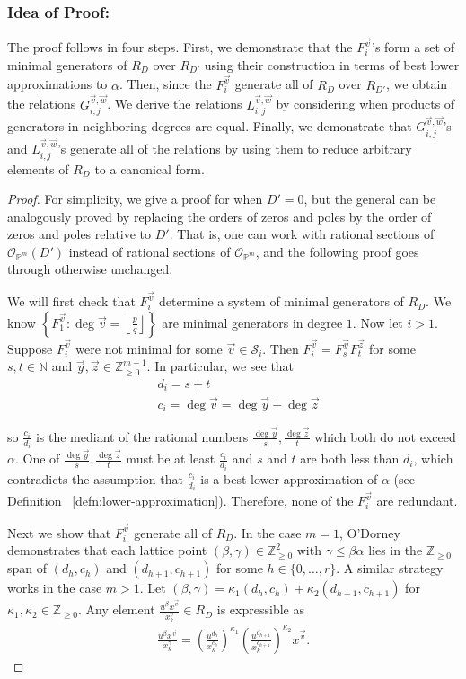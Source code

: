 \documentclass{amsart}
\theoremstyle{plain}
\theoremstyle{definition}
\theoremstyle{remark}
\numberwithin{equation}{section}
\newcommand\sssec{\subsubsection}
\newcommand\bn{{\mathbb N}}
\newcommand\bp{{\mathbb P}}
\newcommand\bz{{\mathbb Z}}
\newcommand\mss{\mathscr{S}}
\begin{document}
\sssec*{Idea of Proof:}
The proof follows in four steps. First, we demonstrate that
the $F_{i}^{\vec{v}}$'s form a set of minimal generators of $R_D$
over $R_{D'}$ using their construction in terms of best lower
approximations to $\alpha$. Then, since the $F_{i}^{\vec{v}}$ generate
all of $R_D$ over $R_{D'}$, we obtain the
relations $G_{i, j}^{\vec{v}, \vec{w}}$.
We derive the relations
$L_{i, j}^{\vec{v}, \vec{w}}$ by considering when products of
generators in neighboring degrees are equal. Finally, we demonstrate
that $G_{i, j}^{\vec{v}, \vec{w}}$'s and $L_{i, j}^{\vec{v}, \vec{w}}$'s
generate all of the relations by using them to reduce arbitrary
elements of
$R_D$ to a canonical form.

\begin{proof}
For simplicity, we give a proof for when $D' = 0$, but the general
can be analogously proved by replacing the orders of zeros and poles
by the order of zeros and poles relative to $D'$. That is,
one can work with rational sections of $\mathscr O_{\bp^m}(D')$
instead of rational sections of $\mathscr O_{\bp^m}$,
and the following proof goes through otherwise unchanged.

We will first check that $F^{\vec v}_i$ determine a system of minimal
generators of $R_D$. We know $\left\{F_{1}^{\vec{v}} : \deg \vec{v} =
\left\lfloor
\frac{p}{q} \right\rfloor \right\}$ are minimal generators in
degree $1$. Now let $i > 1$. Suppose $F_i^{\vec{v}}$ were not
minimal for some $\vec{v} \in \mss_i$. Then $F_i^{\vec{v}} =
F_{s}^{\vec{y}} F_{t}^{\vec{z}}$ for some $s, t \in \bn$ and
$\vec{y}, \vec{z} \in \bz_{ \geq 0}^{m + 1}$. In particular, we see
that 
\begin{align*}
	&d_i = s + t \\
	&c_i = \deg \vec{v} = \deg \vec{y} + \deg \vec{z}
\end{align*}

\noindent
so $\frac{c_i}{d_i}$ is the mediant of the rational numbers
$\frac{\deg \vec{y}}{s}, \frac{\deg \vec{z}}{t}$ which both
do not exceed $\alpha$. One of $\frac{\deg \vec{y}}{s},
\frac{\deg \vec{z}}{t}$ must be at least $\frac{c_i}{d_i}$
and $s$ and $t$ are both less than $d_i$, which contradicts the assumption that
$\frac{c_i}{d_i}$ is a best lower approximation of $\alpha$
(see Definition ~\ref{defn:lower-approximation}). Therefore, none of the $F_i^{\vec v}$ are redundant.

Next we show that $F^{\vec v}_i$ generate all of $R_D$. In the case $m = 1$, O'Dorney \cite[Theorem 6]
{dorney:canonical} demonstrates that each lattice point $(\beta, \gamma) \in
\bz_{\geq 0}^2$ with $\gamma \leq \beta \alpha$ lies in the $\bz_{\geq 0}$ span
of $(d_h, c_h)$ and $(d_{h + 1}, c_{h + 1})$ for
some $h \in \{0, \ldots, r\}$. A similar strategy works in the case $m > 1$. Let $(\beta, \gamma) = \kappa_1
(d_h, c_h) + \kappa_2 (d_{h + 1}, c_{h + 1})$ for $\kappa_1, \kappa_2 \in
\bz_{\geq 0}$. Any element $\frac{u^{\beta}
x^{\vec{v}}} {x_k^{ \gamma}} \in R_D$ is expressible as
\begin{align*}
	\frac{u^{\beta} x^{\vec{v}}} {x_k^{\gamma}} = \left(\frac{u^{d_h}}
	{x_k^{c_h}}\right)^{\kappa_1} \left(\frac{u^{d_{h + 1}}}
	{x_k^{c_{h + 1}}}\right)^{\kappa_2} x^{\vec{v}}.
\end{align*}


\end{proof}
\end{document}
